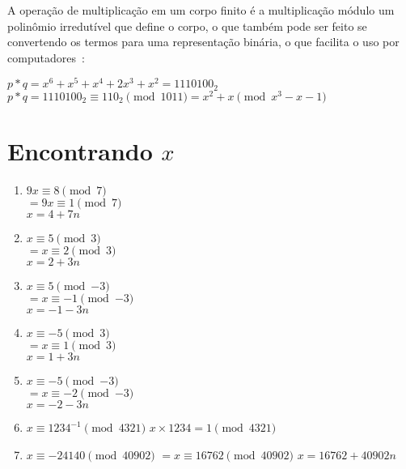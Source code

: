 \documentclass[12pt]{article}
\begin{document}
A operação de multiplicação em um corpo finito é a multiplicação módulo um
polinômio irredutível que define o corpo, o que também pode ser feito se
convertendo os termos para uma representação binária, o que facilita o uso por
computadores~\cite{stallings:2002}:

\begin{center}
    $p*q = x^{6}+x^{5}+x^{4}+2x^{3}+x^{2} = {1110100}_2$ \\
    $p*q = {1110100}_2 \equiv {110}_2 \pmod{1011} = x^{2}+x \pmod{x^{3}-x-1}$
\end{center}

\section{Encontrando $x$}

\begin{enumerate}[label=\textbf{\alph*})]
    \setlength\itemsep{1em}

    \item
        $9x \equiv 8 \pmod{7}$ \\
        $= 9x \equiv 1 \pmod{7}$ \\
        $x = 4+7n$

    \item
        $x \equiv 5 \pmod{3}$ \\
        $= x \equiv 2 \pmod{3}$ \\
        $x = 2+3n$

    \item
        $x \equiv 5 \pmod{-3}$ \\
        $= x \equiv -1 \pmod{-3}$ \\
        $x = -1-3n$

    \item
        $x \equiv -5 \pmod{3}$ \\
        $= x \equiv 1 \pmod{3}$ \\
        $x = 1+3n$

    \item
        $x \equiv -5 \pmod{-3}$ \\
        $= x \equiv -2 \pmod{-3}$ \\
        $x = -2-3n$

    \item
        $x \equiv 1234^{-1} \pmod{4321}$
        $x \times 1234 = 1 \pmod{4321}$

    \item
        $x \equiv -24140 \pmod{40902}$
        $= x \equiv 16762 \pmod{40902}$
        $x = 16762+40902n$
\end{enumerate}
\end{document}
